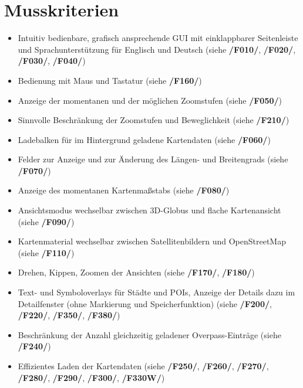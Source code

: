 \documentclass[10pt]{scrreprt}
\begin{document}
\section{Musskriterien}
\begin{itemize}
\item Intuitiv bedienbare, grafisch ansprechende GUI mit einklappbarer Seitenleiste und Sprachunterstützung für Englisch und Deutsch (siehe \textbf{/F010/}, \textbf{/F020/}, \textbf{/F030/}, \textbf{/F040/})
\item Bedienung mit Maus und Tastatur (siehe \textbf{/F160/})
\item Anzeige der momentanen und der möglichen Zoomstufen (siehe \textbf{/F050/})
\item Sinnvolle Beschränkung der Zoomstufen und Beweglichkeit (siehe \textbf{/F210/})
\item Ladebalken für im Hintergrund geladene Kartendaten (siehe \textbf{/F060/})
\item Felder zur Anzeige und zur Änderung des Längen- und Breitengrads (siehe \textbf{/F070/})
\item Anzeige des momentanen Kartenmaßstabs (siehe \textbf{/F080/})
\item Ansichtsmodus wechselbar zwischen 3D-Globus und flache Kartenansicht (siehe \textbf{/F090/})
\item Kartenmaterial wechselbar zwischen Satellitenbildern und OpenStreetMap (siehe \textbf{/F110/})
\item Drehen, Kippen, Zoomen der Ansichten (siehe \textbf{/F170/}, \textbf{/F180/})
\item Text- und Symboloverlays für Städte und POIs, Anzeige der Details dazu im Detailfenster (ohne Markierung und Speicherfunktion) (siehe \textbf{/F200/}, \textbf{/F220/}, \textbf{/F350/}, \textbf{/F380/})
\item Beschränkung der Anzahl gleichzeitig geladener Overpass-Einträge (siehe \textbf{/F240/})
\item Effizientes Laden der Kartendaten (siehe \textbf{/F250/}, \textbf{/F260/}, \textbf{/F270/}, \textbf{/F280/}, \textbf{/F290/}, \textbf{/F300/}, \textbf{/F330W/})
\end{itemize}
\end{document}
